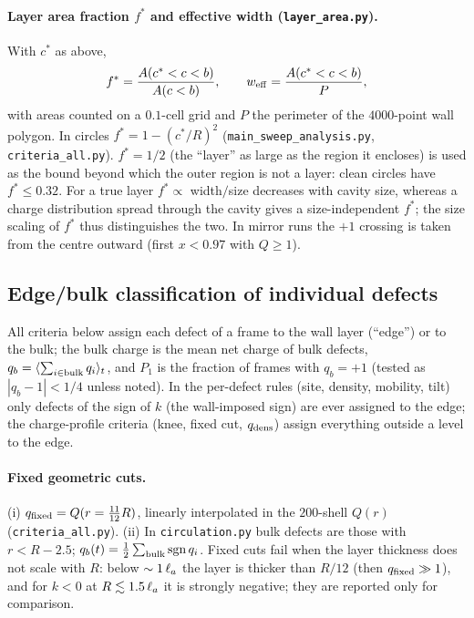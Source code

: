 \paragraph{Layer area fraction $f^*$ and effective width (\texttt{layer\_area.py}).}
With $c^*$ as above,
\begin{equation}
  f^* = \frac{A(c^*<c<b)}{A(c<b)},\qquad w_{\rm eff}=\frac{A(c^*<c<b)}{P},
\end{equation}
with areas counted on a $0.1$-cell grid and $P$ the perimeter of the $4000$-point wall polygon.
In circles $f^*=1-(c^*/R)^2$ (\texttt{main\_sweep\_analysis.py}, \texttt{criteria\_all.py}).
$f^*=1/2$ (the ``layer'' as large as the region it encloses) is used as the bound beyond which the
outer region is not a layer: clean circles have $f^*\le0.32$. For a true layer $f^*\propto$
width$/$size decreases with cavity size, whereas a charge distribution spread through the cavity
gives a size-independent $f^*$; the size scaling of $f^*$ thus distinguishes the two.
In mirror runs the $+1$ crossing is taken from the centre outward (first $x<0.97$ with $Q\ge1$).

\subsection{Edge/bulk classification of individual defects}
\label{sec:methods-criteria}\label{sec:edge}

All criteria below assign each defect of a frame to the wall layer (``edge'') or to the bulk; the bulk
charge is the mean net charge of bulk defects, $q_b=\langle\sum_{i\in\rm bulk}q_i\rangle_t$, and
$P_1$ is the fraction of frames with $q_b=+1$ (tested as $|q_b-1|<1/4$ unless noted).
In the per-defect rules (site, density, mobility, tilt) only defects of the sign of $k$ (the wall-imposed sign) are
ever assigned to the edge; the charge-profile criteria (knee, fixed cut, $q_{\rm dens}$) assign everything outside a level to the edge.

\paragraph{Fixed geometric cuts.}
(i) $q_{\rm fixed}=Q(r=\tfrac{11}{12}R)$, linearly interpolated in the $200$-shell $Q(r)$
(\texttt{criteria\_all.py}). (ii) In \texttt{circulation.py} bulk defects are those with
$r<R-2.5$; $q_b(t)=\tfrac12\sum_{\rm bulk}\mathrm{sgn}\,q_i$. Fixed cuts fail when the layer thickness
does not scale with $R$: below $\sim1\,\ell_a$ the layer is thicker than $R/12$ (then $q_{\rm fixed}\gg1$),
and for $k<0$ at $R\lesssim1.5\,\ell_a$ it is strongly negative; they are reported only for comparison.


